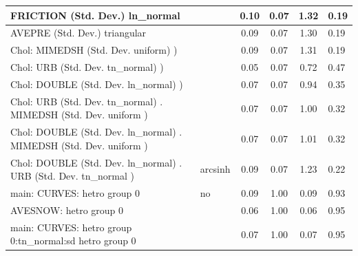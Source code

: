 \begin{table}
\begin{center}
\begin{tabular}{|l|l|c|c|c|l|}
			FRICTION (Std. Dev.) ln_normal &  & 0.10 & 0.07 & 1.32 & 0.19 \\
			\hline
			AVEPRE (Std. Dev.) triangular &  & 0.09 & 0.07 & 1.30 & 0.19 \\
			\hline
			 Chol: MIMEDSH (Std. Dev. uniform) ) &  & 0.09 & 0.07 & 1.31 & 0.19 \\
			\hline
			 Chol: URB (Std. Dev. tn_normal) ) &  & 0.05 & 0.07 & 0.72 & 0.47 \\
			\hline
			 Chol: DOUBLE (Std. Dev. ln_normal) ) &  & 0.07 & 0.07 & 0.94 & 0.35 \\
			\hline
			 Chol: URB (Std. Dev. tn_normal) . MIMEDSH (Std. Dev.   uniform ) &  & 0.07 & 0.07 & 1.00 & 0.32 \\
			\hline
			 Chol: DOUBLE (Std. Dev. ln_normal) . MIMEDSH (Std. Dev.   uniform ) &  & 0.07 & 0.07 & 1.01 & 0.32 \\
			\hline
			 Chol: DOUBLE (Std. Dev. ln_normal) . URB (Std. Dev.   tn_normal ) & arcsinh & 0.09 & 0.07 & 1.23 & 0.22 \\
			\hline
			main: CURVES: hetro group 0 & no & 0.09 & 1.00 & 0.09 & 0.93 \\
			\hline
			AVESNOW: hetro group 0 &  & 0.06 & 1.00 & 0.06 & 0.95 \\
			\hline
			main: CURVES: hetro group 0:tn_normal:sd  hetro group 0 &  & 0.07 & 1.00 & 0.07 & 0.95 \\
			\hline
		\end{tabular}
	\end{center}
\end{table}